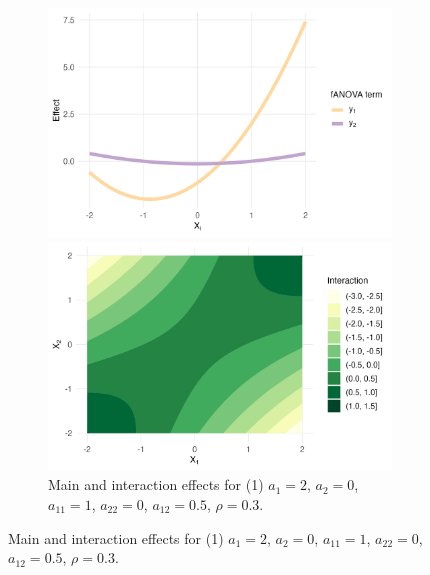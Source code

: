 \begin{figure}[htpb]
    \centering

    \begin{subfigure}[t]{\textwidth}
        \centering
        \begin{minipage}[t]{0.49\textwidth}
            \centering
            \includegraphics[width=\textwidth]{images/experiment_section/full_a1p20_a2p00_a11p10_a22p00_a12p05_rhop03_main.png}
        \end{minipage}%
        \hfill
        \begin{minipage}[t]{0.49\textwidth}
            \centering
            \includegraphics[width=\textwidth]{images/experiment_section/full_a1p20_a2p00_a11p10_a22p00_a12p05_rhop03_interaction.png}
        \end{minipage}
        \caption{Main and interaction effects for (1) $a_1 = 2$, $a_2 = 0$, 
                 $a_{11} = 1$, $a_{22} = 0$, $a_{12} = 0.5$, $\rho = 0.3$.}
    \end{subfigure}


\end{figure}
